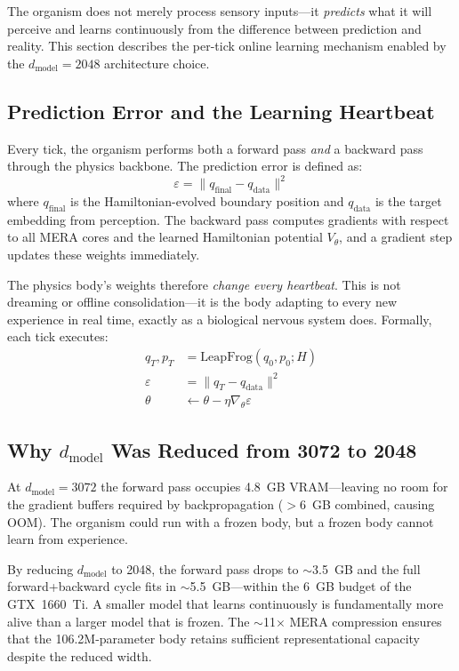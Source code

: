 \documentclass[11pt,a4paper,twocolumn]{article}
\begin{document}
The organism does not merely process sensory inputs---it \emph{predicts} what it will perceive and learns continuously from the difference between prediction and reality.
This section describes the per-tick online learning mechanism enabled by the $d_{\mathrm{model}}=2048$ architecture choice.

\subsection{Prediction Error and the Learning Heartbeat}

Every tick, the organism performs both a forward pass \emph{and} a backward pass through the physics backbone.
The prediction error is defined as:
\begin{equation}
\varepsilon = \|q_{\mathrm{final}} - q_{\mathrm{data}}\|^2
\label{eq:pred_error}
\end{equation}
where $q_{\mathrm{final}}$ is the Hamiltonian-evolved boundary position and $q_{\mathrm{data}}$ is the target embedding from perception.
The backward pass computes gradients with respect to all MERA cores and the learned Hamiltonian potential $V_\theta$, and a gradient step updates these weights immediately.

The physics body's weights therefore \emph{change every heartbeat}.
This is not dreaming or offline consolidation---it is the body adapting to every new experience in real time, exactly as a biological nervous system does.
Formally, each tick executes:
\begin{align}
q_T, p_T &= \mathrm{LeapFrog}(q_0, p_0; H) \label{eq:ptl_forward} \\
\varepsilon &= \|q_T - q_{\mathrm{data}}\|^2 \label{eq:ptl_error} \\
\theta &\leftarrow \theta - \eta \nabla_\theta \varepsilon \label{eq:ptl_update}
\end{align}

\subsection{Why \texorpdfstring{$d_{\mathrm{model}}$}{d\_model} Was Reduced from 3072 to 2048}

At $d_{\mathrm{model}}=3072$ the forward pass occupies 4.8~GB VRAM---leaving no room for the gradient buffers required by backpropagation ($>$6~GB combined, causing OOM).
The organism could run with a frozen body, but a frozen body cannot learn from experience.

By reducing $d_{\mathrm{model}}$ to 2048, the forward pass drops to $\sim$3.5~GB and the full forward+backward cycle fits in $\sim$5.5~GB---within the 6~GB budget of the GTX~1660~Ti.
A smaller model that learns continuously is fundamentally more alive than a larger model that is frozen.
The $\sim$11$\times$ MERA compression ensures that the 106.2M-parameter body retains sufficient representational capacity despite the reduced width.
\end{document}
